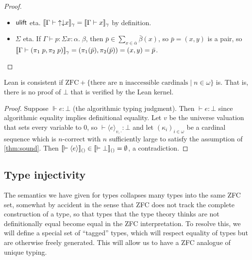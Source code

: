 \begin{proof}
\begin{itemize}
\begin{align*}
\scott{\Gamma\vdash\rec_\acc\;e\;x\;(\intro_\acc\;x\;f)}_\gamma&=\rec_\acc(\bar\alpha,\overline{\bar r},\bar e)(x)(\bullet)=F(x)\\
&=e(\bar x)(\bullet)(y\in\bar\alpha\mapsto(h\in[(y,x)\in\overline{\bar r}]\mapsto F(y))\\
&=e(\bar x)(\bar f)(y\in\bar\alpha\mapsto(h\in[(y,x)\in\overline{\bar r}]\mapsto F(y))\\
&=\scott{\Gamma\vdash e\;x\;f\;(\lambda (y:\alpha)\;(h:r\;y\;x).\;\rec_\acc\;e\;y\;(f\;y\;h))}_\gamma
\end{align*}
where $\bar f=\bullet$ because $f$ is a proof.
\item $\mathsf{ulift}$ eta. $\scott{\Gamma\vdash{\uparrow\downarrow}x}_\gamma=\scott{\Gamma\vdash x}_\gamma$ by definition.
\item $\Sigma$ eta. If $\Gamma\vdash p:\Sigma x:\alpha.\;\beta$, then $\bar p\in\sum_{x\in\bar\alpha}\bar\beta(x)$, so $\bar p=(x,y)$ is a pair, so  $\scott{\Gamma\vdash(\pi_1\;p,\pi_2\;p)}_\gamma=(\pi_1(\bar p),\pi_2(\bar p))=(x,y)=\bar p$.
\end{itemize}
\end{proof}

\begin{corollary}
Lean is consistent if $\mathrm{ZFC}+\{\mbox{there are n inaccessible cardinals}\mid n\in\omega\}$ is. That is, there is no proof of $\bot$ that is verified by the Lean kernel.
\end{corollary}
\begin{proof}
Suppose $\Vdash e:\bot$ (the algorithmic typing judgment). Then $\vdash e:\bot$ since algorithmic equality implies definitional equality. Let $v$ be the universe valuation that sets every variable to 0, so $\vdash\langle e\rangle_{v,\cdot}:\bot$ and let $(\kappa_i)_{i\in\omega}$ be a cardinal sequence which is $n$-correct with $n$ sufficiently large to satisfy the assumption of \autoref{thm:sound}. Then $\llbracket \vdash \langle e\rangle\rrbracket_{()}\in\llbracket \vdash\bot\rrbracket_{()}=\emptyset$, a contradiction.
\end{proof}

\subsection{Type injectivity}
The semantics we have given for types collapses many types into the same ZFC set, somewhat by accident in the sense that ZFC does not track the complete construction of a type, so that types that the type theory thinks are not definitionally equal become equal in the ZFC interpretation. To resolve this, we will define a special set of ``tagged'' types, which will respect equality of types but are otherwise freely generated. This will allow us to have a ZFC analogue of unique typing.

